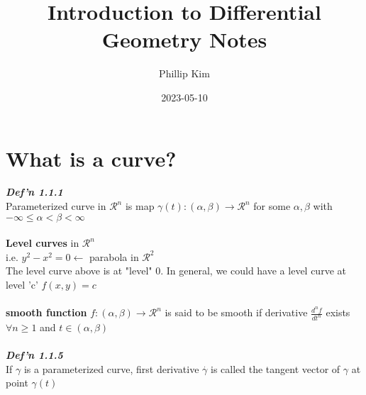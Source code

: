 \documentclass[12pt]{article}
\title{Introduction to Differential Geometry Notes}
\author{Phillip Kim}
\date{2023-05-10}
\begin{document}
\maketitle

\section{What is a curve?}

\emph{\bfseries Def'n 1.1.1} \\
Parameterized curve in \( \mathcal{R}^n \) is map \( \gamma(t):(\alpha, \beta) \longrightarrow \mathcal{R}^n \) for some \( \alpha, \beta \) with \( -\infty \leq \alpha < \beta < \infty \)
\\
\\
{\bfseries Level curves} in \( \mathcal{R}^n \) \\
i.e. \( y^2 - x^2 = 0 \leftarrow \) parabola in \( \mathcal{R}^2 \) \\
The level curve above is at "level" 0. In general, we could have a level curve at level 'c' \( f(x, y) = c\)
\\
\\
{\bfseries smooth function} \( f: (\alpha, \beta) \longrightarrow \mathcal{R}^n \) is said to be smooth if derivative \( \frac{d^n f}{d t^n} \) exists \( \forall n \geq 1 \) and \( t \in (\alpha, \beta) \)
\\
\\
\emph{\bfseries Def'n 1.1.5} \\
If \( \gamma \) is a parameterized curve, first derivative \( \overset{.}{\gamma} \) is called the tangent vector of \( \gamma \) at point \( \gamma(t) \)
\end{document}
